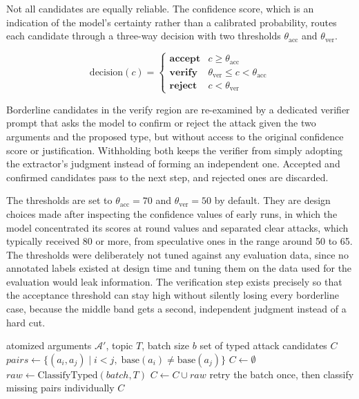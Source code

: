 Not all candidates are equally reliable. The confidence score, which is an
indication of the model's certainty rather than a calibrated probability, routes
each candidate through a three-way decision with two thresholds
$\theta_{\text{acc}}$ and $\theta_{\text{ver}}$.

\begin{equation*}
\text{decision}(c) =
\begin{cases}
  \textbf{accept} & c \geq \theta_{\text{acc}} \\
  \textbf{verify} & \theta_{\text{ver}} \leq c < \theta_{\text{acc}} \\
  \textbf{reject} & c < \theta_{\text{ver}}
\end{cases}
\end{equation*}

Borderline candidates in the verify region are re-examined by a dedicated
verifier prompt that asks the model to confirm or reject the attack given the two
arguments and the proposed type, but without access to the original confidence
score or justification. Withholding both keeps the verifier from simply
adopting the extractor's judgment instead of forming an independent one.
Accepted and confirmed candidates pass to the next step,
and rejected ones are discarded.

The thresholds are set to $\theta_{\text{acc}} = 70$ and
$\theta_{\text{ver}} = 50$ by default. They are design choices made after inspecting the
confidence values of early runs, in which the model concentrated its scores at
round values and separated clear attacks, which typically received 80 or more,
from speculative ones in the range around 50 to 65. The thresholds were
deliberately not tuned against any evaluation data, since no annotated labels
existed at design time and tuning them on the data used for the evaluation
would leak information. The verification step exists precisely so that the
acceptance threshold can stay high without silently losing every borderline
case, because the middle band gets a second, independent judgment instead of a
hard cut.

\begin{algorithm}[tb]
\caption{Typed attack candidate extraction}
\label{alg:method:extraction}
\begin{algorithmic}[1]
\Require atomized arguments $\mathcal{A}'$, topic $T$, batch size $b$
\Ensure set of typed attack candidates $C$
\State $\mathit{pairs} \gets \{(a_i, a_j) \mid i < j,\;
  \mathrm{base}(a_i) \neq \mathrm{base}(a_j)\}$
\State $C \gets \emptyset$
  \State $\mathit{raw} \gets \mathrm{ClassifyTyped}(\mathit{batch}, T)$
    \State $C \gets C \cup \mathit{raw}$
  \Else
    \State retry the batch once, then classify missing pairs individually
  \EndIf
\EndFor
\State \Return $C$
\end{algorithmic}
\end{algorithm}

